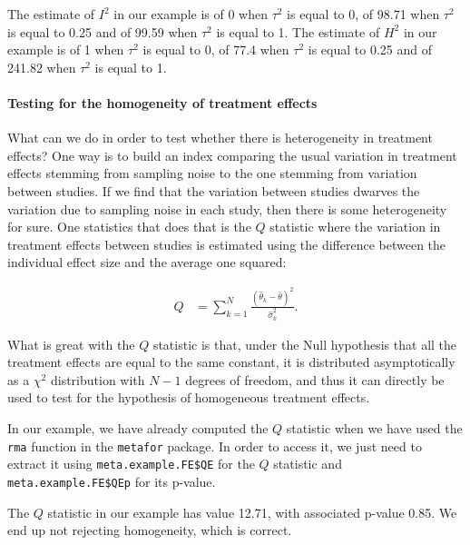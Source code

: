 \documentclass[]{book}
\let\oldparagraph\paragraph
\renewcommand{\paragraph}[1]{\oldparagraph{#1}\mbox{}}
\theoremstyle{definition}
\theoremstyle{definition}
\theoremstyle{definition}
\theoremstyle{remark}
\let\BeginKnitrBlock\begin \let\EndKnitrBlock\end
\begin{document}
The estimate of \(I^2\) in our example is of 0 when \(\tau^2\) is equal to 0, of 98.71 when \(\tau^2\) is equal to 0.25 and of 99.59 when \(\tau^2\) is equal to 1.
The estimate of \(H^2\) in our example is of 1 when \(\tau^2\) is equal to 0, of 77.4 when \(\tau^2\) is equal to 0.25 and of 241.82 when \(\tau^2\) is equal to 1.

\hypertarget{testing-for-the-homogeneity-of-treatment-effects}{%
\paragraph{Testing for the homogeneity of treatment effects}\label{testing-for-the-homogeneity-of-treatment-effects}}

What can we do in order to test whether there is heterogeneity in treatment effects?
One way is to build an index comparing the usual variation in treatment effects stemming from sampling noise to the one stemming from variation between studies.
If we find that the variation between studies dwarves the variation due to sampling noise in each study, then there is some heterogeneity for sure.
One statistics that does that is the \(Q\) statistic where the variation in treatment effects between studies is estimated using the difference between the individual effect size and the average one squared:

\begin{align*}
  Q & = \sum_{k=1}^N\frac{(\hat{\theta}_k-\bar{\theta})^2}{\hat{\sigma}^2_k}.
\end{align*}

What is great with the \(Q\) statistic is that, under the Null hypothesis that all the treatment effects are equal to the same constant, it is distributed asymptotically as a \(\chi^2\) distribution with \(N-1\) degrees of freedom, and thus it can directly be used to test for the hypothesis of homogeneous treatment effects.

\BeginKnitrBlock{example}
\protect\hypertarget{exm:unnamed-chunk-153}{}{\label{exm:unnamed-chunk-153} }In our example, we have already computed the \(Q\) statistic when we have used the \texttt{rma} function in the \texttt{metafor} package.
In order to access it, we just need to extract it using \texttt{meta.example.FE\$QE} for the \(Q\) statistic and \texttt{meta.example.FE\$QEp} for its p-value.
\EndKnitrBlock{example}

The \(Q\) statistic in our example has value 12.71, with associated p-value 0.85.
We end up not rejecting homogeneity, which is correct.
\end{document}
